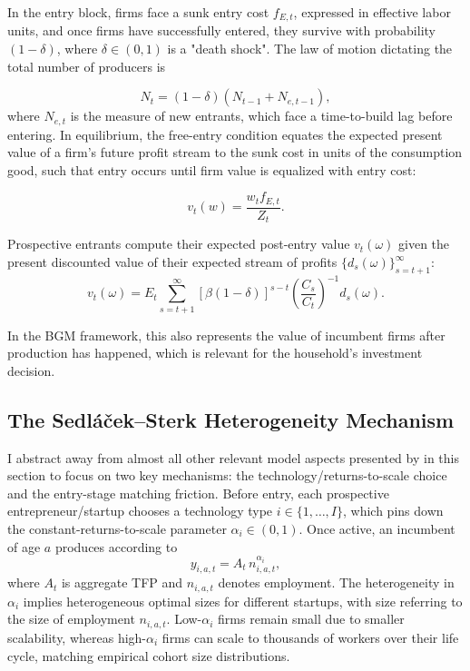 \documentclass[a4paper,12pt]{article} %
\numberwithin{equation}{section} %
\numberwithin{figure}{section}
\numberwithin{table}{section}
\begin{document}
In the entry block, firms face a sunk entry cost $f_{E,t}$, expressed in effective labor units, and once firms have successfully entered, they survive
with probability $(1-\delta)$, where $\delta \in (0,1)$ is a "death shock". The law of motion dictating the total number of producers is 

    \[
    N_t = (1-\delta)(N_{t-1} + N_{e,t-1}),
    \]
where $N_{e,t}$ is the measure of new entrants, which face a time-to-build lag before entering. In equilibrium, the free-entry condition equates the expected present value of a firm's
future profit stream to the sunk cost in units of the consumption good, such that entry occurs until firm value is equalized with entry cost:

\[
    v_t(w) = \frac{w_t f_{E,t}}{Z_t}.
\]

Prospective entrants compute their expected post-entry value $v_t(\omega)$ given the present discounted value of their expected stream of profits
$\{d_s(\omega)\}_{s=t+1}^\infty$: 
$$v_{t}(\omega) = E_t \sum_{s = t+1}^{\infty} \left[ \beta (1 - \delta) \right]^{s - t} \left( \frac{C_{s}}{C_{t}} \right)^{-1} d_{s}(\omega).$$

In the BGM framework, this also represents the value of incumbent firms after production has happened, which is relevant for the household's investment decision.



\subsection{The Sedláček–Sterk Heterogeneity Mechanism}
\label{sec:model-sedlacek}

I abstract away from almost all other relevant model aspects presented by \textcite{sedlavcek2017growth} 
in this section to focus on two key mechanisms: the technology/returns-to-scale choice and the entry-stage 
matching friction. Before entry, each prospective entrepreneur/startup chooses a technology type $i\in\{1,\dots,I\}$,
which pins down the constant-returns-to-scale parameter $\alpha_i\in(0,1)$. Once active, an incumbent of age $a$ 
produces according to 
\[
y_{i,a,t}=A_t\,n_{i,a,t}^{\alpha_i},
\]
where $A_t$ is aggregate TFP and $n_{i,a,t}$ denotes employment. The heterogeneity in $\alpha_i$ implies 
heterogeneous optimal sizes for different startups, with size referring to the size of employment $n_{i,a,t}$. Low-$\alpha_i$ firms remain small due to smaller scalability, whereas high-$\alpha_i$ firms can scale 
to thousands of workers over their life cycle, matching empirical cohort size distributions. 
\end{document}

